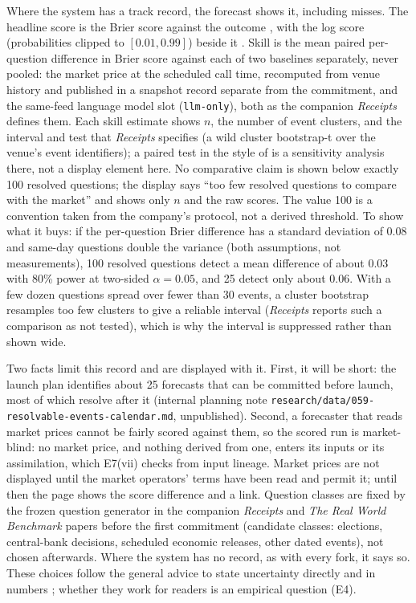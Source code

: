 \documentclass[11pt]{article}
\newcommand{\internal}[1]{internal planning note \nolinkurl{#1}, unpublished}
\begin{document}
Where the system has a track record, the forecast shows it, including misses. The headline score is the Brier score against the outcome \citep{brier1950verification}, with the log score (probabilities clipped to $[0.01,0.99]$) beside it \citep{gneiting2007scoring}. Skill is the mean paired per-question difference in Brier score against each of two baselines separately, never pooled: the market price at the scheduled call time, recomputed from venue history and published in a snapshot record separate from the commitment, and the same-feed language model slot (\texttt{llm-only}), both as the companion \emph{Receipts} defines them. Each skill estimate shows $n$, the number of event clusters, and the interval and test that \emph{Receipts} specifies (a wild cluster bootstrap-t over the venue's event identifiers); a paired test in the style of \citet{diebold1995comparing} is a sensitivity analysis there, not a display element here. No comparative claim is shown below exactly 100 resolved questions; the display says ``too few resolved questions to compare with the market'' and shows only $n$ and the raw scores. The value 100 is a convention taken from the company's protocol, not a derived threshold. To show what it buys: if the per-question Brier difference has a standard deviation of 0.08 and same-day questions double the variance (both assumptions, not measurements), 100 resolved questions detect a mean difference of about 0.03 with 80\% power at two-sided $\alpha=0.05$, and 25 detect only about 0.06. With a few dozen questions spread over fewer than 30 events, a cluster bootstrap resamples too few clusters to give a reliable interval (\emph{Receipts} reports such a comparison as not tested), which is why the interval is suppressed rather than shown wide.

Two facts limit this record and are displayed with it. First, it will be short: the launch plan identifies about 25 forecasts that can be committed before launch, most of which resolve after it (\internal{research/data/059-resolvable-events-calendar.md}). Second, a forecaster that reads market prices cannot be fairly scored against them, so the scored run is market-blind: no market price, and nothing derived from one, enters its inputs or its assimilation, which E7(vii) checks from input lineage. Market prices are not displayed until the market operators' terms have been read and permit it; until then the page shows the score difference and a link. Question classes are fixed by the frozen question generator in the companion \emph{Receipts} and \emph{The Real World Benchmark} papers before the first commitment (candidate classes: elections, central-bank decisions, scheduled economic releases, other dated events), not chosen afterwards. Where the system has no record, as with every fork, it says so. These choices follow the general advice to state uncertainty directly and in numbers \citep{vanderbles2019communicating}; whether they work for readers is an empirical question (E4).
\end{document}
